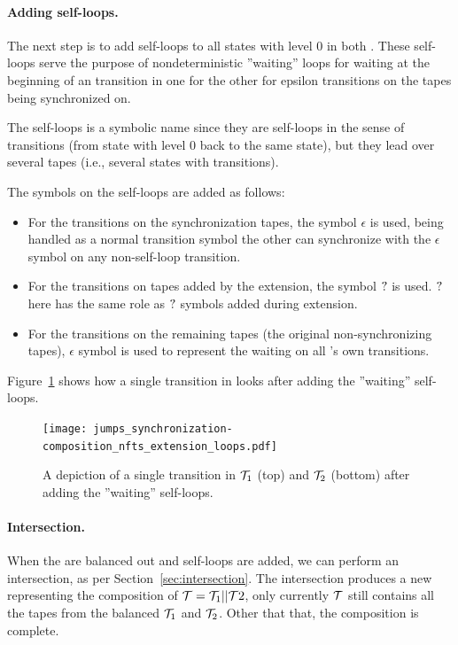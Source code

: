 \paragraph{Adding self-loops.}
The next step is to add self-loops to all states with level $0$ in both \nfts.
These self-loops serve the purpose of nondeterministic ''waiting'' loops for waiting at the beginning of an \nft transition in one \nft for the other \nft for epsilon transitions on the tapes being synchronized on.

The self-loops is a symbolic name since they are self-loops in the sense of \nft transitions (from state with level $0$ back to the same state), but they lead over several tapes (i.e., several states with transitions).

The symbols on the self-loops are added as follows:
\begin{itemize}
  \item For the transitions on the synchronization tapes, the symbol $\epsilon$ is used, being handled as a normal transition symbol the other \nft can synchronize with the $\epsilon$ symbol on any non-self-loop transition.
  \item For the transitions on tapes added by the extension, the symbol $?$ is used.
  $?$ here has the same role as $?$ symbols added during extension.
  \item For the transitions on the remaining tapes (the original non-synchronizing tapes), $\epsilon$ symbol is used to represent the waiting on all \nft's own transitions.
\end{itemize}

\begin{example}
  Figure~\ref{fig:composition_nfts_extension_loops} shows how a single transition in \nfts looks after adding the ''waiting'' self-loops.
  \begin{figure}[ht]
    \centering
    \texttt{[image: jumps\_synchronization-composition\_nfts\_extension\_loops.pdf]}
    \caption{
      A depiction of a single transition in \nfts $\mathcal{T}_1$ (top) and $\mathcal{T}_2$ (bottom) after adding the ''waiting'' self-loops.
    }
    \label{fig:composition_nfts_extension_loops}
  \end{figure}
\end{example}

\paragraph{Intersection.}
When the \nfts are balanced out and self-loops are added, we can perform an \nft intersection, as per Section~\ref{sec:intersection}.
The intersection produces a new \nft representing the composition of $\mathcal{T} = \mathcal{T}_1 || \mathcal{T}2$, only currently $\mathcal{T}$ still contains all the tapes from the balanced $\mathcal{T}_1$ and $\mathcal{T}_2$.
Other that that, the composition is complete.

